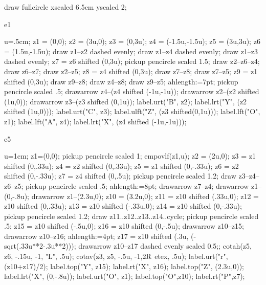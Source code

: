 \documentclass[12pt,a4paper,twocolumn]{book} %
\begin{document}
\begin{mpdisplay}
draw fullcircle xscaled 6.5cm yscaled 2\mpdim\baselineskip;
\end{mpdisplay}
e1
\begin{mpdisplay}
u=.5cm;
z1 = (0,0);
z2 = (3u,0);
z3 = (0,3u);
z4 = (-1.5u,-1.5u);
z5 = (3u,3u);
z6 = (1.5u,-1.5u);
draw z1--z2 dashed evenly;
draw z1--z4 dashed evenly;
draw z1--z3 dashed evenly;
z7 = z6 shifted (0,3u);
pickup pencircle scaled 1.5;
draw z2--z6--z4;
draw z6--z7;
draw z2--z5;
z8 = z4 shifted (0,3u);
draw z7--z8;
draw z7--z5;
z9 = z1 shifted (0,3u);
draw z9--z8;
draw z4--z8;
draw z9--z5;
ahlength:=7pt;
pickup pencircle scaled .5;
drawarrow z4--(z4 shifted (-1u,-1u));
drawarrow z2--(z2 shifted (1u,0));
drawarrow z3--(z3 shifted (0,1u));
label.urt("B", z2);
label.lrt("Y", (z2 shifted (1u,0)));
label.urt("C", z3);
label.ulft("Z", (z3 shifted(0,1u)));
label.lft("O", z1);
label.lft("A", z4);
label.lrt("X", (z4 shifted (-1u,-1u)));
\end{mpdisplay}
e5
\begin{mpdisplay}
  u=1cm;
  z1=(0,0);
  pickup pencircle scaled 1;
  empovlf(z1,u);
  z2 = (2u,0);
  z3 = z1 shifted (0,.33u);
  z4 = z2 shifted (0,.33u);
  z5 = z1 shifted (0,-.33u);
  z6 = z2 shifted (0,-.33u);
  z7 = z4 shifted (0,.5u);
  pickup pencircle scaled 1.2;
  draw z3--z4--z6--z5;
  pickup pencircle scaled .5;
  ahlength:=8pt;
  drawarrow z7--z4;
  drawarrow z1--(0,-.8u);
  drawarrow z1--(2.3u,0);
  z10 = (3.2u,0);
  z11 = z10 shifted (.33u,0);
  z12 = z10 shifted (0,.33u);
  z13 = z10 shifted (-.33u,0);
  z14 = z10 shifted (0,-.33u);
  pickup pencircle scaled 1.2;
  draw z11..z12..z13..z14..cycle;
  pickup pencircle scaled .5;
  z15 = z10 shifted (-.5u,0);
  z16 = z10 shifted (0,-.5u);
  drawarrow z10--z15;
  drawarrow z10--z16;
  ahlength:=4pt;
  z17 = z10 shifted (.3u, (-sqrt(.33u**2-.3u**2)));
  drawarrow z10--z17 dashed evenly scaled 0.5;;
  cotah(z5, z6, -.15u, -1, "L", .5u);
  cotav(z3, z5, -.5u, -1,\btex $\rm 2R$ etex, .5u);
  label.urt("r", (z10+z17)/2);
  label.top("Y", z15);
  label.rt("X", z16);
  label.top("Z", (2.3u,0));
  label.lrt("X", (0,-.8u));
  label.urt("O", z1);
  label.top("O",z10);
  label.rt("P",z7);
\end{mpdisplay}
\end{document}
